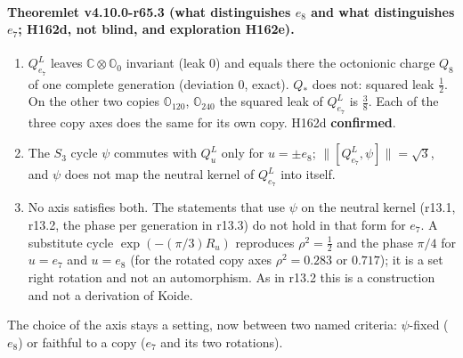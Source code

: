 \paragraph{Theoremlet v4.10.0-r65.3 (what distinguishes \(e_8\) and what distinguishes \(e_7\); H162d, not blind, and exploration H162e).}
\begin{enumerate}[leftmargin=2em]
\item[(a)] \(Q^L_{e_7}\) leaves \(\mathbb C\otimes\mathbb O_0\) invariant (leak \(0\)) and equals there the octonionic charge \(Q_8\) of one complete
generation (deviation \(0\), exact).  \(Q_*\) does not: squared leak \(\tfrac12\).  On the other two copies \(\mathbb O_{120}\), \(\mathbb O_{240}\) the
squared leak of \(Q^L_{e_7}\) is \(\tfrac38\).  Each of the three copy axes does the same for its own copy.  H162d \textbf{confirmed}.
\item[(b)] The \(S_3\) cycle \(\psi\) commutes with \(Q^L_u\) only for \(u=\pm e_8\); \(\lVert[Q^L_{e_7},\psi]\rVert=\sqrt3\), and \(\psi\) does not
map the neutral kernel of \(Q^L_{e_7}\) into itself.
\item[(c)] No axis satisfies both.  The statements that use \(\psi\) on the neutral kernel (r13.1, r13.2, the phase per generation in r13.3) do not
hold in that form for \(e_7\).  A substitute cycle \(\exp(-(\pi/3)R_u)\) reproduces \(\rho^2=\tfrac12\) and the phase \(\pi/4\) for \(u=e_7\) and
\(u=e_8\) (for the rotated copy axes \(\rho^2=0.283\) or \(0.717\)); it is a set right rotation and not an automorphism.  As in r13.2 this is a
construction and not a derivation of Koide.
\end{enumerate}
The choice of the axis stays a setting, now between two named criteria: \(\psi\)-fixed (\(e_8\)) or faithful to a copy (\(e_7\) and its two
rotations).

